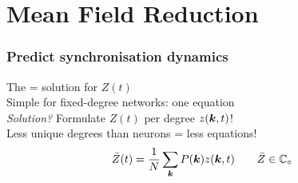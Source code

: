 \section{\theory Mean Field Reduction}
\begin{frame}
\frametitle{Predict synchronisation dynamics} 
The \MFR = solution for $Z(t)$\\ 
Simple for fixed-degree networks: one equation\\[0.5cm]

\textsl{Solution?} Formulate $Z(t)$ per degree $z({\boldsymbol{k}},t)$!\\
\tabitem Less unique degrees than neurons = less equations! \\
\begin{align*}
\bar{Z}(t) &= \frac{1}{N} \sum_{{\boldsymbol{k}}} P({\boldsymbol{k}}) z({\boldsymbol{k}}, t) \qquad \bar{Z} \in \mathbb{C}_\circ \label{eq:OttAntonsenMeanField}
\end{align*}
\end{frame}

